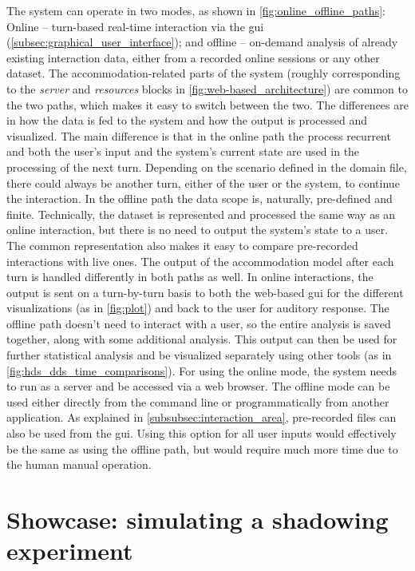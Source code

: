 The system can operate in two modes, as shown in \cref{fig:online_offline_paths}:
Online -- turn-based real-time interaction via the \ac{gui} (\cref{subsec:graphical_user_interface}); and offline -- on-demand analysis of already existing interaction data, either from a recorded online sessions or any other dataset.
The accommodation-related parts of the system (roughly corresponding to the \emph{server} and \emph{resources} blocks in \cref{fig:web-based_architecture}) are common to the two paths, which makes it easy to switch between the two.
The differences are in how the data is fed to the system and how the output is processed and visualized.
The main difference is that in the online path the process recurrent and both the user's input and the system's current state are used in the processing of the next turn.
Depending on the scenario defined in the domain file, there could always be another turn, either of the user or the system, to continue the interaction.
In the offline path the data scope is, naturally, pre-defined and finite.
Technically, the dataset is represented and processed the same way as an online interaction, but there is no need to output the system's state to a user.
The common representation also makes it easy to compare pre-recorded interactions with live ones.
The output of the accommodation model after each turn is handled differently in both paths as well.
In online interactions, the output is sent on a turn-by-turn basis to both the web-based \ac{gui} for the different visualizations (as in \cref{fig:plot}) and back to the user for auditory response.
The offline path doesn't need to interact with a user, so the entire analysis is saved together, along with some additional analysis.
This output can then be used for further statistical analysis and be visualized separately using other tools (as in \cref{fig:hds_dds_time_comparisons}).
For using the online mode, the system needs to run as a server and be accessed via a web browser.
The offline mode can be used either directly from the command line or programmatically from another application.
As explained in \cref{subsubsec:interaction_area}, pre-recorded files can also be used from the \ac{gui}.
Using this option for all user inputs would effectively be the same as using the offline path, but would require much more time due to the human manual operation.

\section{Showcase: simulating a shadowing experiment}
\label{sec:showcase}

